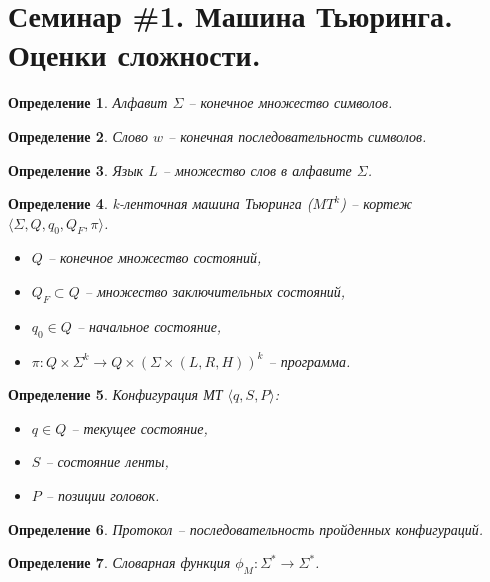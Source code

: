\documentclass[a4paper, 12pt]{extarticle}
\title{}
\author{}
\date{}
\newtheorem*{definition}{Определение}
\begin{document}
\section*{Семинар \#1. Машина Тьюринга. Оценки сложности.}

\begin{definition}
 Алфавит $\Sigma$ -- конечное множество символов.
\end{definition}

\begin{definition}
 Слово $w$ -- конечная последовательность символов.
\end{definition}

\begin{definition}
 Язык $L$ -- множество слов в алфавите $\Sigma$.
\end{definition}

\begin{definition}
 k-ленточная машина Тьюринга ($MT^{k}$) -- кортеж $\langle \Sigma, Q, q_0, Q_F, \pi\rangle$.
 \begin{itemize}
  \item $Q$ -- конечное множество состояний,
  \item  $Q_F \subset Q$ -- множество заключительных состояний,
  \item  $q_0 \in Q$ -- начальное состояние,
  \item  $\pi : Q \times \Sigma^k \rightarrow Q \times (\Sigma \times (L, R, H))^k$ -- программа.
 \end{itemize}
\end{definition}

\begin{definition}
 Конфигурация МТ $\langle q, S, P\rangle$: 
 \begin{itemize}
  \item $q \in Q$  -- текущее состояние,
  \item $S$ -- состояние ленты,
  \item $P$ -- позиции головок.
 \end{itemize}
\end{definition}

\begin{definition}
 Протокол -- последовательность пройденных конфигураций.
\end{definition}

\begin{definition}
 Словарная функция $\phi_M: \Sigma^* \rightarrow \Sigma^*$.
\end{definition}
\end{document}
